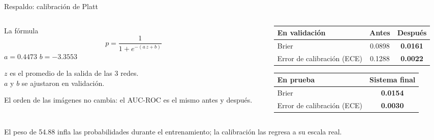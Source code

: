\documentclass[aspectratio=169,10pt]{beamer}
\begin{document}
\begin{frame}{Respaldo: calibración de Platt}
  \begin{columns}[c]
    \begin{column}{0.46\textwidth}
      \begin{block}{La fórmula}
        \[ p = \frac{1}{1 + e^{-(a\,z + b)}} \]
        \centering $a = 0.4473$ \qquad $b = -3.3553$\\[0.4em]
        \raggedright
        $z$ es el promedio de la salida de las 3 redes.\\
        $a$ y $b$ se ajustaron en validación.
      \end{block}
      \small El orden de las imágenes no cambia: el AUC-ROC es el mismo antes y después.
    \end{column}
    \begin{column}{0.50\textwidth}
      \centering
      \small
      \begin{tabular}{lcc}
        \toprule
        \textbf{En validación} & \textbf{Antes} & \textbf{Después} \\
        \midrule
        Brier & 0.0898 & \textbf{0.0161} \\
        Error de calibración (ECE) & 0.1288 & \textbf{0.0022} \\
        \bottomrule
      \end{tabular}
      \vspace{1.0em}

      \begin{tabular}{lc}
        \toprule
        \textbf{En prueba} & \textbf{Sistema final} \\
        \midrule
        Brier & \textbf{0.0154} \\
        Error de calibración (ECE) & \textbf{0.0030} \\
        \bottomrule
      \end{tabular}
    \end{column}
  \end{columns}
  \vspace{0.6em}
  \begin{center}
    \small El peso de 54.88 infla las probabilidades durante el entrenamiento; la calibración las regresa a su escala real.
  \end{center}
\end{frame}
\end{document}
